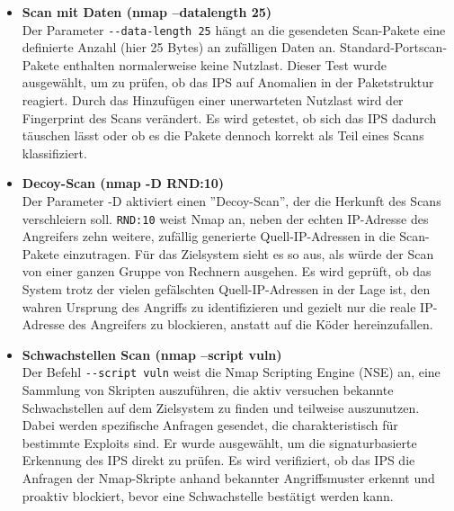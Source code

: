 \begin{itemize}
	\item \textbf{Scan mit Daten (nmap --datalength 25)}\\
	Der Parameter \verb|--data-length 25| hängt an die gesendeten Scan-Pakete eine definierte Anzahl (hier 25 Bytes) an zufälligen Daten an. Standard-Portscan-Pakete enthalten normalerweise keine Nutzlast.
	Dieser Test wurde ausgewählt, um zu prüfen, ob das IPS auf Anomalien in der Paketstruktur reagiert. Durch das Hinzufügen einer unerwarteten Nutzlast wird der Fingerprint des Scans verändert. Es wird getestet, ob sich das IPS dadurch täuschen lässt oder ob es die Pakete dennoch korrekt als Teil eines Scans klassifiziert.\\
	
	\item \textbf{Decoy-Scan (nmap -D RND:10)}\\
	Der Parameter -D aktiviert einen ''Decoy-Scan'', der die Herkunft des Scans verschleiern soll. \verb|RND:10| weist Nmap an, neben der echten IP-Adresse des Angreifers zehn weitere, zufällig generierte Quell-IP-Adressen in die Scan-Pakete einzutragen. Für das Zielsystem sieht es so aus, als würde der Scan von einer ganzen Gruppe von Rechnern ausgehen. Es wird geprüft, ob das System trotz der vielen gefälschten Quell-IP-Adressen in der Lage ist, den wahren Ursprung des Angriffs zu identifizieren und gezielt nur die reale IP-Adresse des Angreifers zu blockieren, anstatt auf die Köder hereinzufallen.\\
	
	\item \textbf{Schwachstellen Scan (nmap --script vuln)}\\
	Der Befehl \verb|--script vuln|  weist die Nmap Scripting Engine (NSE) an, eine Sammlung von Skripten auszuführen, die aktiv versuchen bekannte Schwachstellen auf dem Zielsystem zu finden und teilweise auszunutzen. Dabei werden spezifische Anfragen gesendet, die charakteristisch für bestimmte Exploits sind.  Er wurde ausgewählt, um die signaturbasierte Erkennung des IPS direkt zu prüfen. Es wird verifiziert, ob das IPS die Anfragen der Nmap-Skripte anhand bekannter Angriffsmuster erkennt und proaktiv blockiert, bevor eine Schwachstelle bestätigt werden kann.
\end{itemize}

